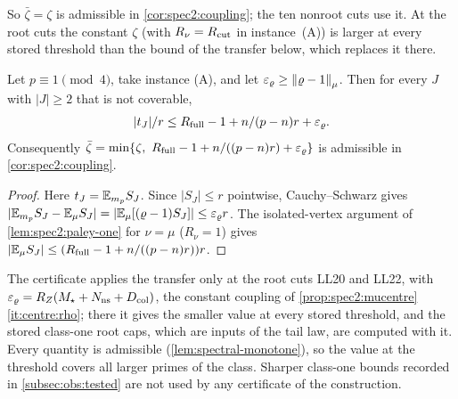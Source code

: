 So $\bar\zeta=\zeta$ is admissible in \cref{cor:spec2:coupling}; the ten nonroot cuts use it.
At the root cuts the constant $\zeta$ (with $R_\nu=R_{\mathrm{cut}}$ in instance~\textup{(A)}) is larger at every stored threshold than the bound of the transfer below, which replaces it there.

\begin{lemma}\label{lem:spec2:parity-transfer}
Let $p\equiv1\pmod4$, take instance \textup{(A)}, and let $\varepsilon_\varrho\ge\left\|\varrho-1\right\|_\mu$.
Then for every $J$ with $|J|\ge2$ that is not coverable,
\[
  |t_J|/r\le R_{\rm full}-1+n/(p-n)r+\varepsilon_\varrho .
\]
Consequently $\bar\zeta=\min\{\zeta,\ R_{\rm full}-1+n/((p-n)r)+\varepsilon_\varrho\}$ is admissible in
\cref{cor:spec2:coupling}.
\end{lemma}

\begin{proof}
Here $t_J=\mathbb E_{m_p}S_J$. Since $|S_J|\le r$ pointwise, Cauchy--Schwarz gives
$|\mathbb E_{m_p}S_J-\mathbb E_\mu S_J|=|\mathbb E_\mu[(\varrho-1)S_J]|\le\varepsilon_\varrho r$. The isolated-vertex argument
of \cref{lem:spec2:paley-one} for $\nu=\mu$ ($R_\nu=1$) gives
$|\mathbb E_\mu S_J|\le(R_{\rm full}-1+n/((p-n)r))r$.
\end{proof}

The certificate applies the transfer only at the root cuts LL20 and LL22, with
$\varepsilon_\varrho=R_Z(M_\star+N_{\rm ns}+D_{\rm col})$, the constant coupling of
\cref{prop:spec2:mucentre}\ref{it:centre:rho}; there it gives the smaller value at every
stored threshold, and the stored class-one root caps, which are inputs of the tail law,
are computed with it. Every quantity is
admissible (\cref{lem:spectral-monotone}), so the value at the threshold covers all
larger primes of the class. Sharper class-one bounds recorded in \cref{subsec:obs:tested} are not used by any certificate of the construction.

